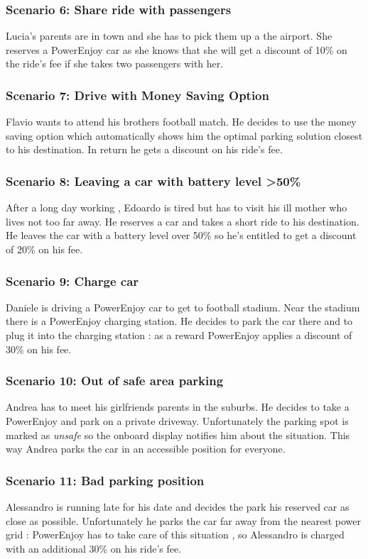 \documentclass[12pt]{article}
\begin{document}
		\subsubsection{Scenario 6: Share ride with passengers}
		Lucia's parents are in town and she has to pick them up a the airport. She reserves
		a PowerEnjoy car as she knows that she will get a discount of 10\% on the ride's fee
		if she takes two passengers with her.
		
		\subsubsection{Scenario 7: Drive with Money Saving Option}
		Flavio wants to attend his brothers football match. He decides to use the money saving 
		option which automatically shows him the optimal parking solution closest to his destination.
		In return he gets a discount on his ride's fee.
		
		\subsubsection{Scenario 8: Leaving a car with battery level >50\%}
		After a long day working , Edoardo is tired but has to visit his ill mother who lives not too
		far away. He reserves a car and takes a short ride to his destination. He leaves the car with
		a battery level over 50\% so he's entitled to get a discount of 20\% on his fee.
		
		\subsubsection{Scenario 9: Charge car}
		Daniele is driving a PowerEnjoy car to get to football stadium. Near the stadium there is a 
		PowerEnjoy charging station. He decides to park the car there and to plug it into the 
		charging station : as a reward PowerEnjoy applies a discount of 30\% on his fee.
		
		\subsubsection{Scenario 10: Out of safe area parking}
		Andrea has to meet his girlfriends parents in the suburbs. He decides to take a PowerEnjoy
		and park on a private driveway. Unfortunately the parking spot is marked as \emph{unsafe} so 	
		the onboard  display notifies him about the situation. This way Andrea parks the car in an
		accessible position for everyone.
		
		\subsubsection{Scenario 11: Bad parking position}
		Alessandro is running late for his date and decides the park his reserved car as close as 
		possible. Unfortunately he parks the car far away from the nearest power grid : PowerEnjoy 
		has to take care of this situation , so Alessandro is charged with an additional 30\% on his
		ride's fee.
		
		
\end{document}
